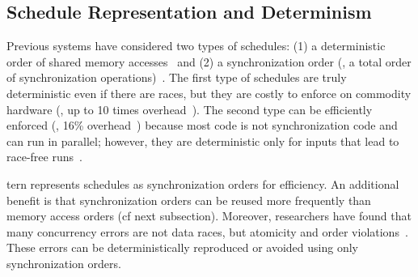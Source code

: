 

\subsection{Schedule Representation and Determinism} \label{sec:define-schedule}

Previous \dmt systems have considered two types of schedules: (1) a
deterministic order of shared memory
accesses~\cite{dmp:asplos09,coredet:asplos10} and (2) a synchronization
order (\ie, a total order of synchronization
operations)~\cite{kendo:asplos09}.  The first type of schedules are truly
deterministic even if there are races, but they are costly to enforce on
commodity hardware (\eg, up to 10 times overhead~\cite{coredet:asplos10}).  The
second type can be efficiently enforced (\eg, 16\%
overhead~\cite{kendo:asplos09}) because most code is not synchronization
code and can run in parallel; however, they are deterministic only for
inputs that lead to race-free runs~\cite{recplay:tocs,kendo:asplos09}.

tern represents schedules as synchronization orders for efficiency.  An
additional benefit is that synchronization orders can be reused more
frequently than memory access orders (cf next subsection).
Moreover, researchers have found that many concurrency errors
are not data races, but atomicity and order
violations~\cite{lu:concurrency-bugs}.  These errors can be
deterministically reproduced or avoided using only  synchronization orders.

